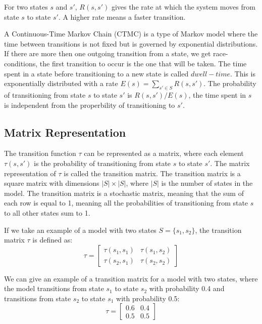 For two states $s$ and $s'$, $R(s, s')$ gives the rate at which the system moves from state $s$ to state $s'$. 
A higher rate means a faster transition.

A Continuous-Time Markov Chain (CTMC) is a type of Markov model where the time between transitions is not fixed but is governed by exponential distributions. 
If there are more then one outgoing transition from a state, we get race-conditions, the first transition to occur is the one that will be taken. 
The time spent in a state before transitioning to a new state is called $dwell-time$. 
This is exponentially distributed with a rate $E(s) = \sum_{s' \in S} R(s, s')$. 
The probability of transitioning from state $s$ to state $s'$ is $R(s, s')/E(s)$, the time spent in $s$ is independent from the properbility of transitioning to $s'$.

\subsection{Matrix Representation}
The transition function $\tau$ can be represented as a matrix, where each element $\tau(s, s')$ is the probability of transitioning from state $s$ to state $s'$. 
The matrix representation of $\tau$ is called the transition matrix. 
The transition matrix is a square matrix with dimensions $|S| \times |S|$, where $|S|$ is the number of states in the model. 
The transition matrix is a stochastic matrix, meaning that the sum of each row is equal to 1, meaning all the probabilities of transitioning from state $s$ to all other states sum to 1.

If we take an example of a model with two states $S = \{s_1, s_2\}$, the transition matrix $\tau$ is defined as:
\begin{equation}
    \tau = \begin{bmatrix}
        \tau(s_1, s_1) & \tau(s_1, s_2) \\
        \tau(s_2, s_1) & \tau(s_2, s_2)
    \end{bmatrix}
\end{equation}


We can give an example of a transition matrix for a model with two states, where the model transitions from state $s_1$ to state $s_2$ with probability 0.4 and transitions from state $s_2$ to state $s_1$ with probability 0.5:
\begin{equation}
    \tau = \begin{bmatrix}
        0.6 & 0.4 \\
        0.5 & 0.5
    \end{bmatrix}
\end{equation}

